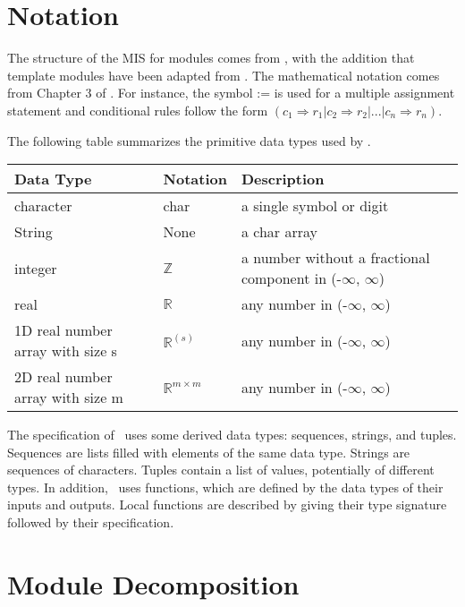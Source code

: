 \documentclass[12pt, titlepage]{article}
\begin{document}
\section{Notation}
The structure of the MIS for modules comes from \citet{HoffmanAndStrooper1995},
with the addition that template modules have been adapted from
\cite{GhezziEtAl2003}.  The mathematical notation comes from Chapter 3 of
\citet{HoffmanAndStrooper1995}.  For instance, the symbol := is used for a
multiple assignment statement and conditional rules follow the form $(c_1
\Rightarrow r_1 | c_2 \Rightarrow r_2 | ... | c_n \Rightarrow r_n )$.

The following table summarizes the primitive data types used by \progname.

\begin{center}
\renewcommand{\arraystretch}{1.2}
\noindent
\begin{tabular}{l l p{7.5cm}}
\toprule
\textbf{Data Type} & \textbf{Notation} & \textbf{Description}\\
\midrule
character & char & a single symbol or digit\\
String & None & a char array\\
integer & $\mathbb{Z}$ & a number without a fractional component in (-$\infty$, $\infty$) \\
real & $\mathbb{R}$ & any number in (-$\infty$, $\infty$)\\
1D real number array with size s & $\mathbb{R}^(s)$ & any number in (-$\infty$, $\infty$)\\
2D real number array with size m & $\mathbb{R}^{m \times m}$ & any number in (-$\infty$, $\infty$)\\
\bottomrule
\end{tabular}
\end{center}

\noindent
The specification of \progname \ uses some derived data types: sequences, strings, and
tuples. Sequences are lists filled with elements of the same data type. Strings
are sequences of characters. Tuples contain a list of values, potentially of
different types. In addition, \progname \ uses functions, which
are defined by the data types of their inputs and outputs. Local functions are
described by giving their type signature followed by their specification.

\section{Module Decomposition}
\end{document}
